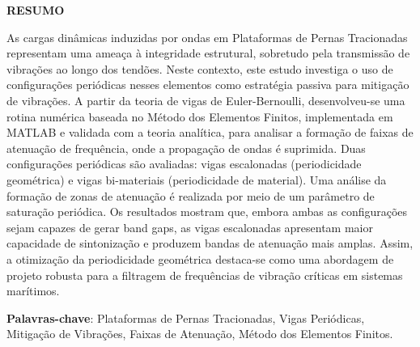 \makeatletter
    \setlength{\absparsep}{18pt}
\makeatother

\begin{center}
    \textbf{RESUMO}
\end{center}
\vspace{.5cm}

\noindent
As cargas dinâmicas induzidas por ondas em Plataformas de Pernas Tracionadas representam uma ameaça à integridade estrutural, sobretudo pela transmissão de vibrações ao longo dos tendões. Neste contexto, este estudo investiga o uso de configurações periódicas nesses elementos como estratégia passiva para mitigação de vibrações. A partir da teoria de vigas de Euler-Bernoulli, desenvolveu-se uma rotina numérica baseada no Método dos Elementos Finitos, implementada em MATLAB e validada com a teoria analítica, para analisar a formação de faixas de atenuação de frequência, onde a propagação de ondas é suprimida. Duas configurações periódicas são avaliadas: vigas escalonadas (periodicidade geométrica) e vigas bi-materiais (periodicidade de material). Uma análise da formação de zonas de atenuação é realizada por meio de um parâmetro de saturação periódica. Os resultados mostram que, embora ambas as configurações sejam capazes de gerar band gaps, as vigas escalonadas apresentam maior capacidade de sintonização e produzem bandas de atenuação mais amplas. Assim, a otimização da periodicidade geométrica destaca-se como uma abordagem de projeto robusta para a filtragem de frequências de vibração críticas em sistemas marítimos.

\vspace{18pt}\noindent\textbf{Palavras-chave}: Plataformas de Pernas Tracionadas, Vigas Periódicas, Mitigação de Vibrações, Faixas de Atenuação, Método dos Elementos Finitos.